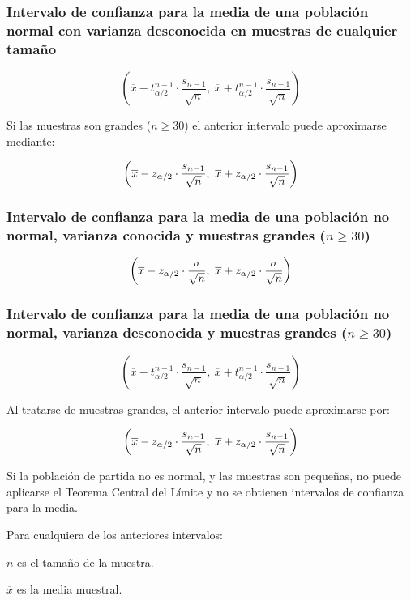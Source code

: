 \documentclass[a4paper]{article}
\begin{document}
\subsubsection*{Intervalo de confianza para la media de una población
normal con varianza desconocida en muestras de cualquier tamaño}

\[
\left( \overline{x}-t_{\alpha /2}^{n-1}\cdot
\dfrac{s_{n-1}}{\sqrt{n}},\ \overline{x}+t_{\alpha /2}^{n-1}\cdot
\dfrac{s_{n-1}}{\sqrt{n}}\right)
\]

Si las muestras son grandes ($n\geq30$) el anterior intervalo
puede aproximarse mediante:

\[
\left( \overline{x}-z_{\alpha /2}\cdot \dfrac{s_{n-1}}{\sqrt{n}},\ \overline{%
x}+z_{\alpha /2}\cdot \dfrac{s_{n-1}}{\sqrt{n}}\right)
\]



\subsubsection*{Intervalo de confianza para la media de una población no normal,
 varianza conocida y muestras grandes ($n\geq 30$)}

\[
\left( \overline{x}-z_{\alpha /2}\cdot \dfrac{\sigma }{\sqrt{n}},\ \overline{%
x}+z_{\alpha /2}\cdot \dfrac{\sigma }{\sqrt{n}}\right)
\]

\subsubsection*{Intervalo de confianza para la media de una población no normal,
 varianza desconocida y muestras grandes ($n\geq30$)}
\[
\left( \overline{x}-t_{\alpha /2}^{n-1}\cdot
\dfrac{s_{n-1}}{\sqrt{n}},\ \overline{x}+t_{\alpha /2}^{n-1}\cdot
\dfrac{s_{n-1}}{\sqrt{n}}\right)
\]

Al tratarse de muestras grandes, el anterior intervalo puede
aproximarse por:

\[
\left( \overline{x}-z_{\alpha /2}\cdot \dfrac{s_{n-1}}{\sqrt{n}},\ \overline{%
x}+z_{\alpha /2}\cdot \dfrac{s_{n-1}}{\sqrt{n}}\right)
\]

Si la población de partida no es normal, y las muestras son
pequeñas, no puede aplicarse el Teorema Central del Límite y no se
obtienen intervalos de confianza para la media.

Para cualquiera de los anteriores intervalos:

$n$ es el tamaño de la muestra.

$\overline{x}$ es la media muestral.
\end{document}
